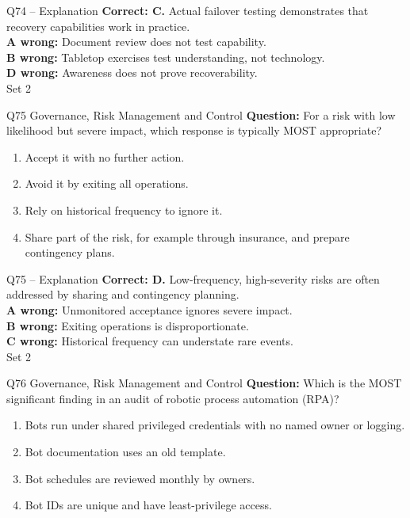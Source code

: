 \documentclass[aspectratio=169,10pt]{beamer}
\begin{document}
\begin{frame}[t]{Q74 -- Explanation}
	\footnotesize
	\textbf{Correct: C.} Actual failover testing demonstrates that recovery capabilities work in practice. \\[5pt]
\textbf{A wrong:} Document review does not test capability. \\[3pt]
\textbf{B wrong:} Tabletop exercises test understanding, not technology. \\[3pt]
\textbf{D wrong:} Awareness does not prove recoverability. \\[3pt]
	\vfill {\tiny Set 2}
\end{frame}

\begin{frame}[t]{Q75 \hfill {\scriptsize Governance, Risk Management and Control}}
	\small
	\textbf{Question:} For a risk with low likelihood but severe impact, which response is typically MOST appropriate?
	\begin{enumerate}[label=\Alph*.,itemsep=1pt,topsep=3pt]
			\item Accept it with no further action.
			\item Avoid it by exiting all operations.
			\item Rely on historical frequency to ignore it.
			\item Share part of the risk, for example through insurance, and prepare contingency plans.
	\end{enumerate}
\end{frame}

\begin{frame}[t]{Q75 -- Explanation}
	\footnotesize
	\textbf{Correct: D.} Low-frequency, high-severity risks are often addressed by sharing and contingency planning. \\[5pt]
\textbf{A wrong:} Unmonitored acceptance ignores severe impact. \\[3pt]
\textbf{B wrong:} Exiting operations is disproportionate. \\[3pt]
\textbf{C wrong:} Historical frequency can understate rare events. \\[3pt]
	\vfill {\tiny Set 2}
\end{frame}

\begin{frame}[t]{Q76 \hfill {\scriptsize Governance, Risk Management and Control}}
	\small
	\textbf{Question:} Which is the MOST significant finding in an audit of robotic process automation (RPA)?
	\begin{enumerate}[label=\Alph*.,itemsep=1pt,topsep=3pt]
			\item Bots run under shared privileged credentials with no named owner or logging.
			\item Bot documentation uses an old template.
			\item Bot schedules are reviewed monthly by owners.
			\item Bot IDs are unique and have least-privilege access.
	\end{enumerate}
\end{frame}
\end{document}
